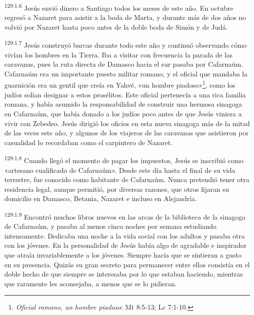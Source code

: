 \par 
\textsuperscript{129:1.6} Jesús envió dinero a Santiago todos los meses de este año. En octubre regresó a Nazaret para asistir a la boda de Marta, y durante más de dos años no volvió por Nazaret hasta poco antes de la doble boda de Simón y de Judá.

\par 
\textsuperscript{129:1.7} Jesús construyó barcas durante todo este año y continuó observando cómo vivían los hombres en la Tierra. Iba a visitar con frecuencia la parada de las caravanas, pues la ruta directa de Damasco hacia el sur pasaba por Cafarnaúm. Cafarnaúm era un importante puesto militar romano, y el oficial que mandaba la guarnición era un gentil que creía en Yahvé, «un hombre piadoso»\footnote{\textit{Oficial romano, un hombre piadoso}: Mt 8:5-13; Lc 7:1-10.}, como los judíos solían designar a estos prosélitos. Este oficial pertenecía a una rica familia romana, y había asumido la responsabilidad de construir una hermosa sinagoga en Cafarnaúm, que había donado a los judíos poco antes de que Jesús viniera a vivir con Zebedeo. Jesús dirigió los oficios en esta nueva sinagoga más de la mitad de las veces este año, y algunos de los viajeros de las caravanas que asistieron por casualidad lo recordaban como el carpintero de Nazaret.

\par 
\textsuperscript{129:1.8} Cuando llegó el momento de pagar los impuestos, Jesús se inscribió como «artesano cualificado de Cafarnaúm». Desde este día hasta el final de su vida terrestre, fue conocido como habitante de Cafarnaúm. Nunca pretendió tener otra residencia legal, aunque permitió, por diversas razones, que otros fijaran su domicilio en Damasco, Betania, Nazaret e incluso en Alejandría.

\par 
\textsuperscript{129:1.9} Encontró muchos libros nuevos en las arcas de la biblioteca de la sinagoga de Cafarnaúm, y pasaba al menos cinco noches por semana estudiando intensamente. Dedicaba una noche a la vida social con los adultos y pasaba otra con los jóvenes. En la personalidad de Jesús había algo de agradable e inspirador que atraía invariablemente a los jóvenes. Siempre hacía que se sintieran a gusto en su presencia. Quizás su gran secreto para permanecer entre ellos consistía en el doble hecho de que siempre se interesaba por lo que estaban haciendo, mientras que raramente les aconsejaba, a menos que se lo pidieran.

